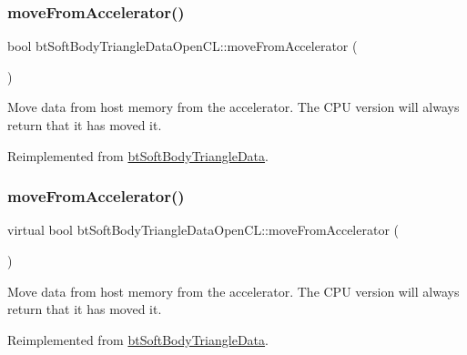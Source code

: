 \subsubsection{\texorpdfstring{move\+From\+Accelerator()}{moveFromAccelerator()}\hspace{0.1cm}{\footnotesize\ttfamily [1/2]}}
{\footnotesize\ttfamily bool bt\+Soft\+Body\+Triangle\+Data\+Open\+C\+L\+::move\+From\+Accelerator (\begin{DoxyParamCaption}{ }\end{DoxyParamCaption})\hspace{0.3cm}{\ttfamily [virtual]}}

Move data from host memory from the accelerator. The C\+PU version will always return that it has moved it. 

Reimplemented from \hyperlink{classbtSoftBodyTriangleData_aa89f5f9a27c9350a95179535c4aaaf8c}{bt\+Soft\+Body\+Triangle\+Data}.

\mbox{\label{classbtSoftBodyTriangleDataOpenCL_a6ff4ef4ea2e8491908c7bf742d4a8833}} 
\subsubsection{\texorpdfstring{move\+From\+Accelerator()}{moveFromAccelerator()}\hspace{0.1cm}{\footnotesize\ttfamily [2/2]}}
{\footnotesize\ttfamily virtual bool bt\+Soft\+Body\+Triangle\+Data\+Open\+C\+L\+::move\+From\+Accelerator (\begin{DoxyParamCaption}{ }\end{DoxyParamCaption})\hspace{0.3cm}{\ttfamily [virtual]}}

Move data from host memory from the accelerator. The C\+PU version will always return that it has moved it. 

Reimplemented from \hyperlink{classbtSoftBodyTriangleData_aa89f5f9a27c9350a95179535c4aaaf8c}{bt\+Soft\+Body\+Triangle\+Data}.

\mbox{\label{classbtSoftBodyTriangleDataOpenCL_af92cd6a17855e603e73595ad229986f5}} 
